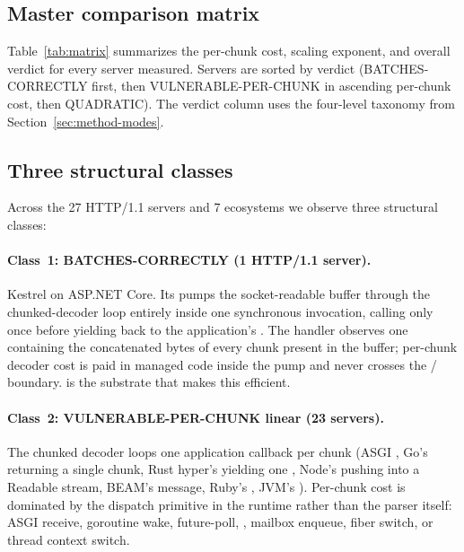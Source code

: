 \subsection{Master comparison matrix}
\label{sec:synth-matrix}

Table~\ref{tab:matrix} summarizes the per-chunk cost, scaling
exponent, and overall verdict for every server measured.
Servers are sorted by verdict (BATCHES-CORRECTLY first, then
VULNERABLE-PER-CHUNK in ascending per-chunk cost, then QUADRATIC).
The verdict column uses the four-level taxonomy from
Section~\ref{sec:method-modes}.

\begin{table}[h]
  \centering
  \footnotesize
  \caption{Master comparison matrix. Per-chunk cost is the
  wall-derived per-chunk cost under Mode B (paced
  \SI{100}{\micro\second}, $N{=}\num{250000}$, 1\,vCPU; $\approx$CPU
  where the core is saturated, Section~\ref{sec:method-metric}).
  Auto-generated from
  \texttt{data/wave*.json} via \texttt{scripts/render\_matrix.py}.}
  \label{tab:matrix}
  
\end{table}

\subsection{Three structural classes}
\label{sec:synth-classes}

Across the 27 HTTP/1.1 servers and 7 ecosystems we observe three
structural classes:

\paragraph{Class~1: BATCHES-CORRECTLY (1 HTTP/1.1 server).}
Kestrel on ASP.NET Core. Its
 pumps the
socket-readable buffer through the chunked-decoder loop entirely
inside one synchronous  invocation, calling
 only once before yielding back to the
application's . The handler observes
one  containing the concatenated bytes of every
chunk present in the buffer; per-chunk decoder cost is paid in
managed code inside the pump and never crosses the
/ boundary.  is
the substrate that makes this efficient.

\paragraph{Class~2: VULNERABLE-PER-CHUNK linear (23 servers).}
The chunked decoder loops one application callback per chunk
(ASGI , Go's  returning a
single chunk, Rust hyper's
 yielding one ,
Node's  pushing into a Readable stream,
BEAM's  message, Ruby's
, JVM's
). Per-chunk cost is dominated
by the dispatch primitive in the runtime rather than the parser
itself: ASGI receive, goroutine wake, future-poll,
, mailbox enqueue, fiber switch, or
thread context switch.


